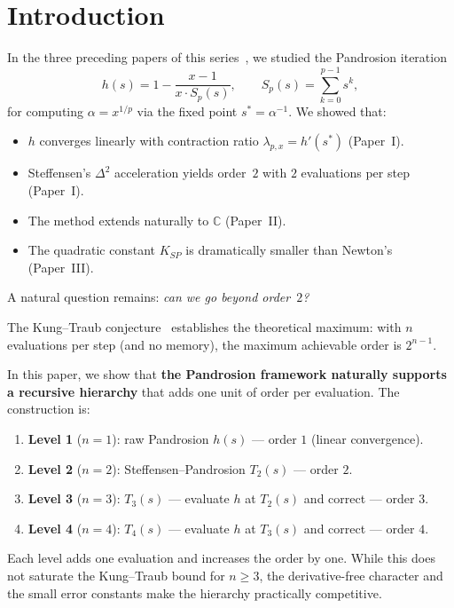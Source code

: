 \documentclass[10pt,a4paper,oneside]{book}
\theoremstyle{definition}
\theoremstyle{remark}
\newcommand{\CC}{\mathbb{C}}
\begin{document}
\bigskip

\section{Introduction}

In the three preceding papers of this series~\cite{besevic2026,besevic2026b,besevic2026c}, we studied the Pandrosion iteration
\begin{equation}
  \label{eq:pandrosion}
  h(s) = 1 - \frac{x-1}{x \cdot S_p(s)},
  \qquad S_p(s) = \sum_{k=0}^{p-1} s^k,
\end{equation}
for computing $\alpha = x^{1/p}$ via the fixed point $s^* = \alpha^{-1}$.  We showed that:
\begin{itemize}
  \item $h$ converges linearly with contraction ratio $\lambda_{p,x} = h'(s^*)$ (Paper~I).
  \item Steffensen's $\Delta^2$ acceleration yields order~$2$ with $2$ evaluations per step (Paper~I).
  \item The method extends naturally to $\CC$ (Paper~II).
  \item The quadratic constant $K_{SP}$ is dramatically smaller than Newton's (Paper~III).
\end{itemize}

A natural question remains: \emph{can we go beyond order~$2$?}

\medskip

The Kung--Traub conjecture~\cite{kungtraub} establishes the theoretical maximum: with $n$ evaluations per step (and no memory), the maximum achievable order is $2^{n-1}$.

\medskip

In this paper, we show that \textbf{the Pandrosion framework naturally supports a recursive hierarchy} that adds one unit of order per evaluation.  The construction is:
\begin{enumerate}
  \item \textbf{Level 1} ($n=1$): raw Pandrosion $h(s)$ --- order $1$ (linear convergence).
  \item \textbf{Level 2} ($n=2$): Steffensen--Pandrosion $T_2(s)$ --- order $2$.
  \item \textbf{Level 3} ($n=3$): $T_3(s)$ --- evaluate $h$ at $T_2(s)$ and correct --- order $3$.
  \item \textbf{Level 4} ($n=4$): $T_4(s)$ --- evaluate $h$ at $T_3(s)$ and correct --- order $4$.
\end{enumerate}
Each level adds one evaluation and increases the order by one.  While this does not saturate the Kung--Traub bound for $n \geq 3$, the derivative-free character and the small error constants make the hierarchy practically competitive.
\end{document}
